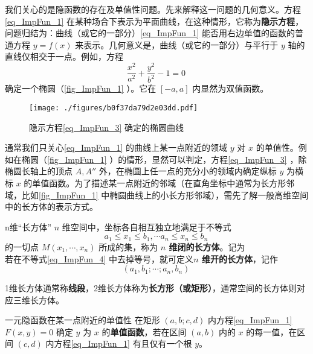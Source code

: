 我们关心的是隐函数的存在及单值性问题。先来解释这一问题的几何意义。方程\autoref{eq_ImpFun_1} 在某种场合下表示为平面曲线，在这种情形，它称为\textbf{隐示方程}，问题归结为：曲线（或它的一部分）\autoref{eq_ImpFun_1} 能否用右边单值的函数的普通方程 $y=f(x)$ 来表示。几何意义是，曲线（或它的一部分）与平行于 $y$ 轴的直线仅相交于一点。例如，方程 
\begin{equation}\label{eq_ImpFun_3}
\frac{x^2}{a^2}+\frac{y^2}{b^2}-1=0~
\end{equation}
确定一个椭圆（\autoref{fig_ImpFun_1} ）。它在 $[-a,a]$ 内显然为双值函数。
\begin{figure}[ht]
\centering
\texttt{[image: ./figures/b0f37da79d2e03dd.pdf]}
\caption{隐示方程\autoref{eq_ImpFun_3} 确定的椭圆曲线} \label{fig_ImpFun_1}
\end{figure}
通常我们只关心\autoref{eq_ImpFun_1} 的曲线上某一点附近的领域 $y$ 对 $x$ 的单值性。例如在椭圆（\autoref{fig_ImpFun_1} ）的情形，显然可以判定，方程\autoref{eq_ImpFun_3} ，除椭圆长轴上的顶点 $A,A''$ 外，在椭圆上任一点的充分小的领域内确定纵标 $y$ 为横标 $x$ 的单值函数。为了描述某一点附近的邻域（在直角坐标中通常为长方形邻域，比如\autoref{fig_ImpFun_1} 中椭圆曲线上的小长方形邻域），需先了解一般高维空间中的长方体的表示方式。
\begin{definition}{n维“长方体”}\label{def_ImpFun_2}
$n$ 维空间中，坐标各自相互独立地满足于不等式
\begin{equation}\label{eq_ImpFun_4}
a_1\leq x_1\leq b_1,\cdots a_n\leq x_n\leq b_n~
\end{equation}
的一切点 $M(x_1,\cdots,x_n)$ 所成的集，称为\textbf{ $n$ 维闭的长方体}。记为
\begin{equation}
[a_1,b_1;\cdots;a_n,b_n]~
\end{equation}
若在不等式\autoref{eq_ImpFun_4} 中去掉等号，就可定义\textbf{$n$ 维开的长方体}，记作
\begin{equation}
(a_1,b_1;\cdots;a_n,b_n)~
\end{equation}

\end{definition}
1维长方体通常称\textbf{线段}，2维长方体称为\textbf{长方形（或矩形）}，通常空间的长方体则对应三维长方体。
\begin{definition}{一元隐函数在某一点附近的单值性}\label{def_ImpFun_1}
在矩形 $(a,b;c,d)$ 内方程\autoref{eq_ImpFun_1} $F(x,y)=0$ 确定 $y$ 为 $x$ 的\textbf{单值函数}，若在区间 $(a,b)$ 内的 $x$ 的每一值，在区间 $(c,d)$ 内方程\autoref{eq_ImpFun_1} 有且仅有一个根 $y$。
\end{definition}

